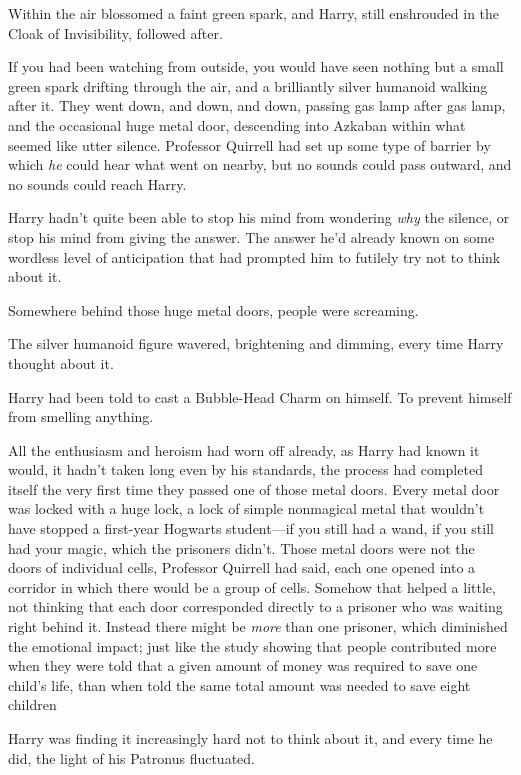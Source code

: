 Within the air blossomed a faint green spark, and Harry, still enshrouded in
the Cloak of Invisibility, followed after.

If you had been watching from outside, you would have seen nothing but a small
green spark drifting through the air, and a brilliantly silver humanoid walking
after it.
\sbreak
They went down, and down, and down, passing gas lamp after gas lamp, and the
occasional huge metal door, descending into Azkaban within what seemed like
utter silence. Professor Quirrell had set up some type of barrier by which
\emph{he} could hear what went on nearby, but no sounds could pass outward, and
no sounds could reach Harry.

Harry hadn't quite been able to stop his mind from wondering \emph{why} the
silence, or stop his mind from giving the answer. The answer he'd already known
on some wordless level of anticipation that had prompted him to futilely try
not to think about it.

Somewhere behind those huge metal doors, people were screaming.

The silver humanoid figure wavered, brightening and dimming, every time Harry
thought about it.

Harry had been told to cast a Bubble-Head Charm on himself. To prevent himself
from smelling anything.

All the enthusiasm and heroism had worn off already, as Harry had known it
would, it hadn't taken long even by his standards, the process had completed
itself the very first time they passed one of those metal doors. Every metal
door was locked with a huge lock, a lock of simple nonmagical metal that
wouldn't have stopped a first-year Hogwarts student---if you still had a wand,
if you still had your magic, which the prisoners didn't. Those metal doors were
not the doors of individual cells, Professor Quirrell had said, each one opened
into a corridor in which there would be a group of cells. Somehow that helped a
little, not thinking that each door corresponded directly to a prisoner who was
waiting right behind it. Instead there might be \emph{more} than one prisoner,
which diminished the emotional impact; just like the study showing that people
contributed more when they were told that a given amount of money was required
to save one child's life, than when told the same total amount was needed to
save eight children{\el}

Harry was finding it increasingly hard not to think about it, and every time he
did, the light of his Patronus fluctuated.

